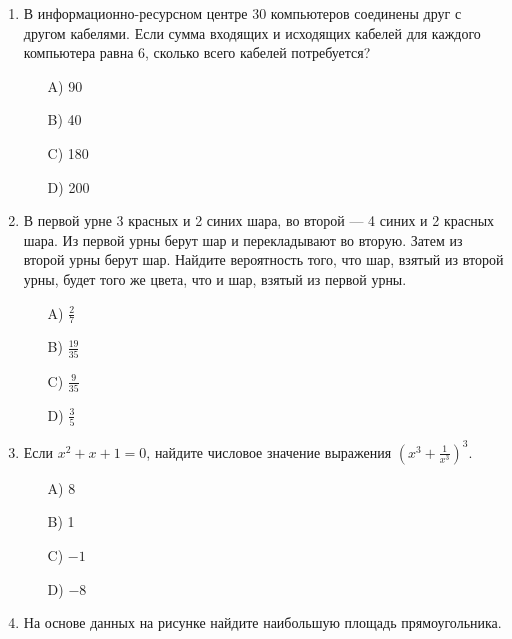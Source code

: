 \documentclass[12pt]{article}
\begin{document}
\begin{enumerate}
\vspace{0.cm} %

\item В информационно-ресурсном центре 30 компьютеров соединены друг с другом кабелями. Если сумма входящих и исходящих кабелей для каждого компьютера равна 6, сколько всего кабелей потребуется? \\
\textbf{}
\begin{enumerate}
    \item[A)] 90
    \item[B)] 40
    \item[C)] 180
    \item[D)] 200
\end{enumerate}

\vspace{0.cm} %

\item В первой урне 3 красных и 2 синих шара, во второй — 4 синих и 2 красных шара. Из первой урны берут шар и перекладывают во вторую. Затем из второй урны берут шар. Найдите вероятность того, что шар, взятый из второй урны, будет того же цвета, что и шар, взятый из первой урны. \\
\textbf{}
\begin{enumerate}
    \item[A)] \(\frac{2}{7}\)
    \item[B)] \(\frac{19}{35}\)
    \item[C)] \(\frac{9}{35}\)
    \item[D)] \(\frac{3}{5}\)
\end{enumerate}

\vspace{0.cm} %

\item Если \(x^2 + x + 1 = 0\), найдите числовое значение выражения \(\left(x^3 + \frac{1}{x^3}\right)^3\). \\
\textbf{}
\begin{enumerate}
    \item[A)] 8
    \item[B)] 1
    \item[C)] \(-1\)
    \item[D)] \(-8\)
\end{enumerate}

\vspace{0.cm} %

\item На основе данных на рисунке найдите наибольшую площадь прямоугольника.
\begin{center}
   

\end{center}
\end{enumerate}
\end{document}
